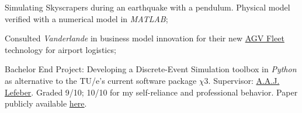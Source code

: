 \documentclass[12pt]{article}
\begin{document}
\begin{compactitem}
    \item Simulating Skyscrapers during an earthquake with a pendulum. Physical model verified with a numerical model in \textit{MATLAB};
    \item Consulted \textit{Vanderlande} in business model innovation for their new  \href{https://www.vanderlande.com/evolutions/fleet/}{AGV Fleet} technology for airport logistics;
    \item Bachelor End Project: Developing a Discrete-Event Simulation toolbox in \textit{Python} as alternative to the TU/e's current software package $\chi3$. Supervisor: \href{https://www.tue.nl/en/research/researchers/erjen-lefeber/}{A.A.J. Lefeber}. Graded 9/10; 10/10 for my self-reliance and professional behavior. Paper publicly available \href{https://dc.wtb.tue.nl/lefeber/do_download_pdf.php?id=288}{here}.
\end{compactitem}
\vspace{0.5cm}
\end{document}
